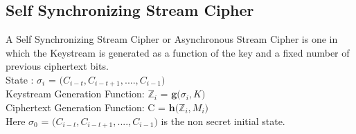 \documentclass[11pt]{article}
\begin{document}
  \subsection*{Self Synchronizing Stream Cipher}
  \begin{flushleft}
      A Self Synchronizing Stream Cipher or Asynchronous Stream Cipher is one in which the Keystream is generated as a function of the key and a fixed number of previous ciphertext bits.\\
      \hspace{1cm} State : $\sigma_i$ = $\big(C_{i-t}, C_{i-t+1}, ... . , C_{i-1}\big)$\\
      \hspace{1cm} Keystream Generation Function: $\mathbb{Z}_i$ = $\mathbf{g}\big(\sigma_i, K\big)$\\
      \hspace{1cm} Ciphertext Generation Function: C = $\mathbf{h}\big(\mathbb{Z}_i, M_i\big)$\\
    Here $\sigma_0$ = $\big(C_{i-t}, C_{i-t+1}, ... . , C_{i-1}\big)$ is the non secret initial state.\\
  \end{flushleft}
\end{document}
